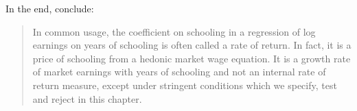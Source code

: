 \begin{frame}
In the end,  conclude:\vspace{0.5cm}

\begin{quote}
In common usage, the coefficient on schooling in a regression of log earnings on years of schooling is often called a rate of return. In fact, it is a price of schooling from a hedonic market wage equation. It is a growth rate of market earnings with years of schooling and not an internal rate of return measure, except under stringent conditions which we specify, test and reject in this chapter.
\end{quote}
\end{frame}
